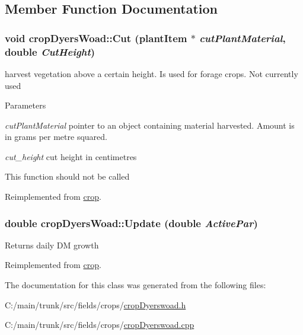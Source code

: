 \subsection{Member Function Documentation}
\hypertarget{classcrop_dyers_woad_a88209c73370f84f4e7f46ab28e6a2097}{
\subsubsection[{Cut}]{\setlength{\rightskip}{0pt plus 5cm}void cropDyersWoad::Cut ({\bf plantItem} $\ast$ {\em cutPlantMaterial}, \/  double {\em CutHeight})}}
\label{classcrop_dyers_woad_a88209c73370f84f4e7f46ab28e6a2097}


harvest vegetation above a certain height. Is used for forage crops. Not currently used 
\begin{DoxyParams}{Parameters}
\item[{\em cutPlantMaterial}]pointer to an object containing material harvested. Amount is in grams per metre squared. \item[{\em cut\_\-height}]cut height in centimetres\end{DoxyParams}
This function should not be called 

Reimplemented from \hyperlink{classcrop_a5b2a6a3522c64790e295055ff164dc10}{crop}.\hypertarget{classcrop_dyers_woad_ac99e68efb5b08aa2e0208b5e925929a8}{
\subsubsection[{Update}]{\setlength{\rightskip}{0pt plus 5cm}double cropDyersWoad::Update (double {\em ActivePar})}}
\label{classcrop_dyers_woad_ac99e68efb5b08aa2e0208b5e925929a8}
Returns daily DM growth 

Reimplemented from \hyperlink{classcrop_a9ed02462e332fffb65498075e7499bf4}{crop}.

The documentation for this class was generated from the following files:\begin{DoxyCompactItemize}
\item 
C:/main/trunk/src/fields/crops/\hyperlink{crop_dyerswoad_8h}{cropDyerswoad.h}\item 
C:/main/trunk/src/fields/crops/\hyperlink{crop_dyerswoad_8cpp}{cropDyerswoad.cpp}\end{DoxyCompactItemize}
